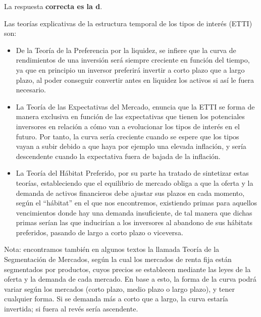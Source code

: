 \documentclass[
  letterpaper,
  DIV=11,
  numbers=noendperiod]{scrartcl}
\begin{document}
\begin{tcolorbox}[enhanced jigsaw, colframe=quarto-callout-note-color-frame, opacityback=0, colback=white, leftrule=.75mm, left=2mm, breakable, arc=.35mm, rightrule=.15mm, toprule=.15mm, bottomrule=.15mm]
\begin{minipage}[t]{5.5mm}
\textcolor{quarto-callout-note-color}{\faInfo}
\end{minipage}%
\begin{minipage}[t]{\textwidth - 5.5mm}

La respuesta \textbf{correcta es la d}.

Las teorías explicativas de la estructura temporal de los tipos de
interés (ETTI) son:

\begin{itemize}
\item
  De la Teoría de la Preferencia por la liquidez, se infiere que la
  curva de rendimientos de una inversión será siempre creciente en
  función del tiempo, ya que en principio un inversor preferirá invertir
  a corto plazo que a largo plazo, al poder conseguir convertir antes en
  liquidez los activos si así le fuera necesario.
\item
  La Teoría de las Expectativas del Mercado, enuncia que la ETTI se
  forma de manera exclusiva en función de las expectativas que tienen
  los potenciales inversores en relación a cómo van a evolucionar los
  tipos de interés en el futuro. Por tanto, la curva sería creciente
  cuando se espere que los tipos vayan a subir debido a que haya por
  ejemplo una elevada inflación, y sería descendente cuando la
  expectativa fuera de bajada de la inflación.
\item
  La Teoría del Hábitat Preferido, por su parte ha tratado de sintetizar
  estas teorías, estableciendo que el equilibrio de mercado obliga a que
  la oferta y la demanda de activos financieros debe ajustar sus plazos
  en cada momento, según el ``hábitat'' en el que nos encontremos,
  existiendo primas para aquellos vencimientos donde hay una demanda
  insuficiente, de tal manera que dichas primas serían las que
  inducirían a los inversores al abandono de sus hábitats preferidos,
  pasando de largo a corto plazo o viceversa.
\end{itemize}

Nota: encontramos también en algunos textos la llamada Teoría de la
Segmentación de Mercados, según la cual los mercados de renta fija están
segmentados por productos, cuyos precios se establecen mediante las
leyes de la oferta y la demanda de cada mercado. En base a esto, la
forma de la curva podrá variar según los mercados (corto plazo, medio
plazo o largo plazo), y tener cualquier forma. Si se demanda más a corto
que a largo, la curva estaría invertida; si fuera al revés sería
ascendente.

\end{minipage}%
\end{tcolorbox}
\end{document}
